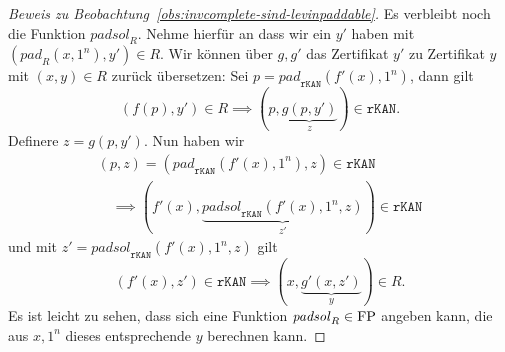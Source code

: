 \begin{proof}[Beweis zu Beobachtung~\ref{obs:invcomplete-sind-levinpaddable}]
    Es verbleibt noch die Funktion $\mathit{padsol}_R$. Nehme hierfür an dass wir ein $y'$ haben mit $(\mathit{pad}_R(x, 1^n), y')\in R$.
    Wir können über $g, g'$ das Zertifikat $y'$ zu Zertifikat $y$ mit $(x, y)\in R$ zurück übersetzen:
    Sei $p=\mathit{pad}_\mathtt{rKAN}(f'(x), 1^n)$, dann gilt
    \[ (f(p), y')\in R \implies (p, \underbrace{g(p, y')}_z)\in \mathtt{rKAN}. \]
    Definere $z=g(p, y')$.
    Nun haben wir
    \begin{gather*} (p, z)=(\mathit{pad}_\mathtt{rKAN}(f'(x), 1^n), z)\in\mathtt{rKAN}  \\\quad\implies (f'(x), \underbrace{\mathit{padsol}_\mathtt{rKAN}(f'(x), 1^n, z)}_{z'})\in\mathtt{rKAN} \end{gather*}
    und mit $z'=\mathit{padsol}_\mathtt{rKAN}(f'(x), 1^n, z)$ gilt
    \[ (f'(x), z') \in \mathtt{rKAN} \implies (x, \underbrace{g'(x, z')}_{y}) \in R. \]
    Es ist leicht zu sehen, dass sich eine Funktion $\mathit{padsol}_R\in\mathrm{FP}$ angeben kann, die aus $x, 1^n$ dieses entsprechende $y$ berechnen kann.
\end{proof}

